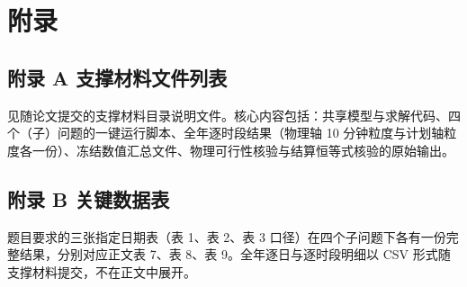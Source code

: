 \documentclass[12pt,a4paper]{ctexart}
\begin{document}
\section*{附录}

\subsection*{附录 A 支撑材料文件列表}

见随论文提交的支撑材料目录说明文件。核心内容包括：共享模型与求解代码、四个（子）问题的一键运行脚本、全年逐时段结果（物理轴 10 分钟粒度与计划轴粒度各一份）、冻结数值汇总文件、物理可行性核验与结算恒等式核验的原始输出。

\subsection*{附录 B 关键数据表}

题目要求的三张指定日期表（表 1、表 2、表 3 口径）在四个子问题下各有一份完整结果，分别对应正文表 7、表 8、表 9。全年逐日与逐时段明细以 CSV 形式随支撑材料提交，不在正文中展开。
\end{document}
